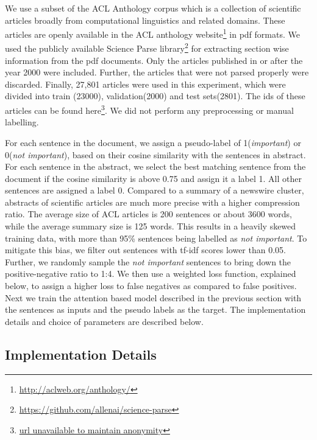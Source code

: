 We use a subset of the ACL Anthology corpus which is a collection of scientific articles broadly from computational linguistics and related domains. These articles are openly available in the ACL anthology website\footnote{\url{http://aclweb.org/anthology/}} in pdf formats. We used the publicly available Science Parse library\footnote{\url{https://github.com/allenai/science-parse}} for extracting section wise information from the pdf documents. Only the articles published in or after the year 2000 were included. Further, the articles that were not parsed properly were discarded. Finally, 27,801 articles were used in this experiment, which were divided into train (23000), validation(2000) and test sets(2801). The ids of these articles can be found here\footnote{\url{url unavailable to maintain anonymity}}. We did not perform any preprocessing or manual labelling. 

For each sentence in the document, we assign a pseudo-label of 1(\emph{important}) or 0(\emph{not important}), based on their cosine similarity with the sentences in abstract. For each sentence in the abstract, we select the best matching sentence from the document if the cosine similarity is above 0.75 and assign it a label 1. All other sentences are assigned a label 0. Compared to a summary of a newswire cluster, abstracts of scientific articles are much more precise with a higher compression ratio. The average size of ACL articles is 200 sentences or about 3600 words, while the average summary size is 125 words. This results in a heavily skewed training data, with more than 95\% sentences being labelled as \emph{not important}. To mitigate this bias, we filter out sentences with tf-idf scores lower than 0.05. Further, we randomly sample the \emph{not important} sentences to bring down the positive-negative ratio to 1:4. We then use a weighted loss function, explained below, to assign a higher loss to false negatives as compared to false positives. Next we train the attention based model described in the previous section with the sentences as inputs and the pseudo labels as the target. The implementation details and choice of parameters are described below.

\subsection{Implementation Details} 

